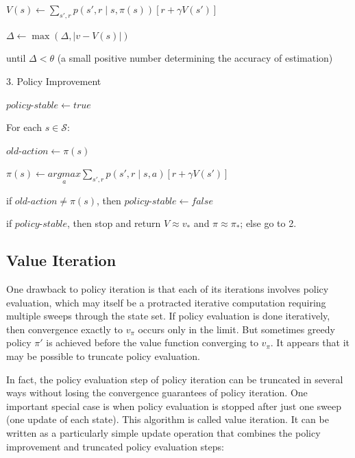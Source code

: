 \documentclass{article}
\begin{document}
\hspace{1.5cm} \(V(s) \leftarrow \sum_{s', r} p(s', r \mid s, \pi(s)) [r + \gamma V(s')]\)

\hspace{1.5cm} \(\Delta \leftarrow \max(\Delta, \vert v -  V(s) \vert)\)

\hspace{.5cm} until \(\Delta < \theta\) (a small positive number determining the accuracy of estimation)

3. Policy Improvement

\hspace{.5cm} \(\textit{policy-stable} \leftarrow true\)

\hspace{.5cm} For each \(s \in \mathcal{S}\):

\hspace{1cm} \(\textit{old-action} \leftarrow \pi(s)\)

\hspace{1cm} \(\pi(s) \leftarrow \underset{a}{argmax} \sum_{s', r} p(s', r \mid s, a) [r + \gamma V(s')]\)

\hspace{1cm} if \(\textit{old-action} \neq \pi(s)\), then \(\textit{policy-stable} \leftarrow false\)

\hspace{.5cm} if \(\textit{policy-stable}\), then stop and return \(V \approx v_*\) and \(\pi \approx \pi_*\); else go to 2.

\subsection{Value Iteration}

One drawback to policy iteration is that each of its iterations involves policy evaluation, 
which may itself be a protracted iterative computation requiring multiple sweeps through the state set. 
If policy evaluation is done iteratively, then convergence exactly to \(v_{\pi}\) occurs only in the limit. 
But sometimes greedy policy \(\pi'\) is achieved before the value function converging to \(v_{\pi}\). 
It appears that it may be possible to truncate policy evaluation.

In fact, the policy evaluation step of policy iteration can be truncated in several ways without losing the convergence guarantees of policy iteration. 
One important special case is when policy evaluation is stopped after just one sweep (one update of each state). This algorithm is called value iteration. 
It can be written as a particularly simple update operation that combines the policy improvement and truncated policy evaluation steps:
\end{document}
